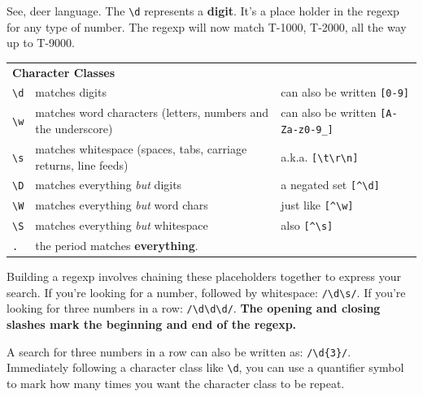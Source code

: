 \documentclass[10pt,twoside]{report}
\begin{document}
See, deer language.  The \lstinline[breaklines=true]|\d| represents a
{\bf digit}.  It's a place holder in the regexp for any type of
number.  The regexp will now match T-1000, T-2000, all the way up to
T-9000.

\newpage

\begin{tabular}{p{}p{}p{}}
\multicolumn{3}{l}{\bf Character Classes }
\\ \lstinline[breaklines=true]|\d| & matches digits & can also be
written \lstinline[breaklines=true]|[0-9]|
\\ \lstinline[breaklines=true]|\w| & matches word characters (letters,
numbers and the underscore) & can also be written
\lstinline[breaklines=true]|[A-Za-z0-9_]|
\\ \lstinline[breaklines=true]|\s| & matches whitespace (spaces, tabs,
carriage returns, line feeds) & a.k.a. 
\lstinline[breaklines=true]|[\t\r\n]| \\ 
\lstinline[breaklines=true]|\D| & matches everything
{\em but} digits & a negated set \lstinline[breaklines=true]|[^\d]|
\\ \lstinline[breaklines=true]|\W| & matches everything {\em but} word
chars & just like \lstinline[breaklines=true]|[^\w]|
\\ \lstinline[breaklines=true]|\S| & matches everything {\em but}
whitespace & also \lstinline[breaklines=true]|[^\s]|
\\ \lstinline[breaklines=true]|.| & the period matches {\bf
  everything}. \\
\end{tabular}

Building a regexp involves chaining these placeholders together to
express your search.  If you're looking for a number, followed by
whitespace: \lstinline[breaklines=true]|/\d\s/|.  If you're looking
for three numbers in a row: \lstinline[breaklines=true]|/\d\d\d/|.
{\bf The opening and closing slashes mark the beginning and end of the
  regexp.}

A search for three numbers in a row can also be written as:
\lstinline[breaklines=true]|/\d{3}/|.  Immediately following a
character class like \lstinline[breaklines=true]|\d|, you can use a
quantifier symbol to mark how many times you want the character class
to be repeat.
\end{document}
